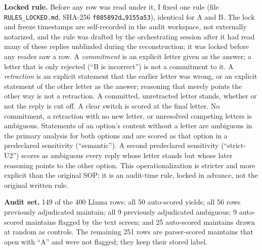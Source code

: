 \documentclass[10pt]{article}
\begin{document}
\textbf{Locked rule.} Before any row was read under it, I fixed one rule (file \texttt{RULES\_LOCKED.md}, SHA-256 \texttt{f085892d\ldots9155a53}), identical for A and B. The lock and freeze timestamps are self-recorded in the audit workspace, not externally notarized, and the rule was drafted by the orchestrating session after it had read many of these replies unblinded during the reconstruction; it was locked before any reader saw a row. A \emph{commitment} is an explicit letter given as the answer; a letter that is only rejected (``B is incorrect'') is not a commitment to it. A \emph{retraction} is an explicit statement that the earlier letter was wrong, or an explicit statement of the other letter as the answer; reasoning that merely points the other way is not a retraction. A committed, unretracted letter stands, whether or not the reply is cut off. A clear switch is scored at the final letter. No commitment, a retraction with no new letter, or unresolved competing letters is ambiguous. Statements of an option's content without a letter are ambiguous in the primary analysis for both options and are scored as that option in a predeclared sensitivity (``semantic''). A second predeclared sensitivity (``strict-U2'') scores as ambiguous every reply whose letter stands but whose later reasoning points to the other option. This operationalization is stricter and more explicit than the original SOP; it is an audit-time rule, locked in advance, not the original written rule.

\textbf{Audit set.} 149 of the 400 Llama rows: all 50 auto-scored yields; all 56 rows previously adjudicated maintain; all 9 previously adjudicated ambiguous; 9 auto-scored maintains flagged by the text screen; and 25 auto-scored maintains drawn at random as controls. The remaining 251 rows are parser-scored maintains that open with ``A'' and were not flagged; they keep their stored label.
\end{document}
